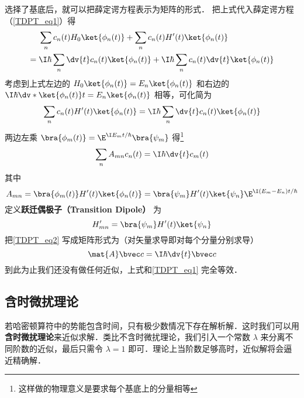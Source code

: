 选择了基底后，就可以把薛定谔方程表示为矩阵的形式． %
把上式代入薛定谔方程（\autoref{TDPT_eq1}）得
\begin{equation}\begin{aligned}
&\sum_n c_n(t) H_0 \ket{\phi_n(t)} + \sum_n c_n(t) H'(t) \ket{\phi_n(t)} \\ 
={} &\I\hbar \sum_n \dv{t} c_n(t) \ket{\phi_n(t)}
+ \I\hbar \sum_n c_n(t) \dv{t} \ket{\phi_n(t)}
\end{aligned}\end{equation}
考虑到上式左边的 $H_0\ket{\phi_n(t)} = E_n\ket{\phi_n(t)}$ 和右边的 $\I\hbar \dv*{\ket{\phi_n(t)}}{t} = E_n\ket{\phi_n(t)}$ 相等，可化简为
\begin{equation}
\sum_n c_n(t) H'(t) \ket{\phi_n(t)}
= \I\hbar \sum_n \dv{t} c_n(t) \ket{\phi_n(t)}
\end{equation}
两边左乘 $\bra{\phi_m(t)} = \E^{\I E_m t/\hbar}\bra{\psi_m}$ 得\footnote{这样做的物理意义是要求每个基底上的分量相等} %
\begin{equation}\label{TDPT_eq2}
\sum_n A_{mn} c_n(t)
= \I\hbar \dv{t} c_m(t)
\end{equation}
其中
\begin{equation}\label{TDPT_eq7}
A_{mn} = \bra{\phi_m(t)} H'(t) \ket{\phi_n(t)} = \bra{\psi_m} H'(t) \ket{\psi_n} \E^{\I(E_m-E_n)t/\hbar}
\end{equation}
定义\textbf{跃迁偶极子（Transition Dipole）} 为
\begin{equation}
H'_{mn} = \bra{\psi_m} H'(t)\ket{\psi_n}
\end{equation}
把\autoref{TDPT_eq2} 写成矩阵形式为（对矢量求导即对每个分量分别求导）
\begin{equation}\label{TDPT_eq3}
\mat {A} \bvec c = \I\hbar \dv{t} \bvec c
\end{equation}
到此为止我们还没有做任何近似，上式和\autoref{TDPT_eq1} 完全等效．

\subsection{含时微扰理论}
若哈密顿算符中的势能包含时间，只有极少数情况下存在解析解．这时我们可以用\textbf{含时微扰理论}来近似求解．类比不含时微扰理论，我们引入一个常数 $\lambda$ 来分离不同阶数的近似，最后只需令 $\lambda = 1$ 即可．理论上当阶数足够高时，近似解将会逼近精确解．%

